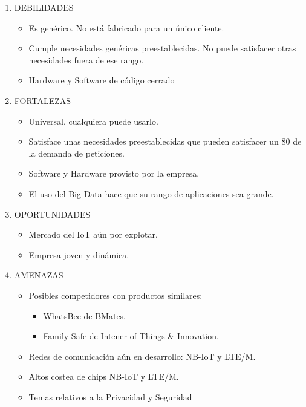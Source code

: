 \begin{enumerate}
\item DEBILIDADES
\begin{itemize}

\item Es genérico. No está fabricado para un único cliente.
\item Cumple necesidades genéricas preestablecidas. No puede satisfacer otras necesidades fuera de ese rango.
\item Hardware y Software de código cerrado
\end{itemize}


\item FORTALEZAS

\begin{itemize}
\item Universal, cualquiera puede usarlo.
\item Satisface unas necesidades preestablecidas que pueden satisfacer un 80 de la demanda de peticiones.
\item Software y Hardware provisto por la empresa.
\item El uso del Big Data hace que su rango de aplicaciones sea grande.
\end{itemize}


\item OPORTUNIDADES

\begin{itemize}
\item Mercado del IoT aún por explotar.
\item Empresa joven y dinámica.
\end{itemize}


\item AMENAZAS
\begin{itemize}
\item Posibles competidores con productos similares:
\begin{itemize}
\item WhatsBee de BMates.
\item Family Safe de Intener of Things & Innovation.
\end{itemize}


\item Redes de comunicación aún en desarrollo: NB-IoT y LTE/M.
\item Altos costea de chips NB-IoT y LTE/M.
\item Temas relativos a la Privacidad y Seguridad
\end{itemize}
\end{enumerate}
